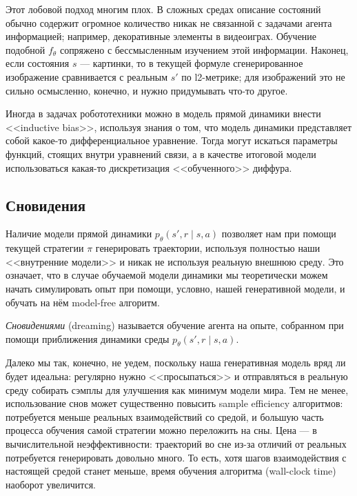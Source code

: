 Этот лобовой подход многим плох. В сложных средах описание состояний обычно содержит огромное количество никак не связанной с задачами агента информацией; например, декоративные элементы в видеоиграх. Обучение подобной $f_\theta$ сопряжено с бессмысленным изучением этой информации. Наконец, если состояния $s$ --- картинки, то в текущей формуле сгенерированное изображение сравнивается с реальным $s'$ по l2-метрике; для изображений это не сильно осмысленно, конечно, и нужно придумывать что-то другое.


\begin{remark}
Иногда в задачах робототехники можно в модель прямой динамики внести <<inductive bias>>, используя знания о том, что модель динамики представляет собой какое-то дифференциальное уравнение. Тогда могут искаться параметры функций, стоящих внутри уравнений связи, а в качестве итоговой модели использоваться какая-то дискретизация <<обученного>> диффура.
\end{remark}

\subsection{Сновидения}

Наличие модели прямой динамики $p_\theta(s', r \mid s, a)$ позволяет нам при помощи текущей стратегии $\pi$ генерировать траектории, используя полностью наши <<внутренние модели>> и никак не используя реальную внешнюю среду. Это означает, что в случае обучаемой модели динамики мы теоретически можем начать симулировать опыт при помощи, условно, нашей генеративной модели, и обучать на нём model-free алгоритм.

\begin{definition}
\emph{Сновидениями} (dreaming) называется обучение агента на опыте, собранном при помощи приближения динамики среды $p_\theta(s', r \mid s, a)$.
\end{definition}

Далеко мы так, конечно, не уедем, поскольку наша генеративная модель вряд ли будет идеальна: регулярно нужно <<просыпаться>> и отправляться в реальную среду собирать сэмплы для улучшения как минимум модели мира. Тем не менее, использование снов может существенно повысить sample efficiency алгоритмов: потребуется меньше реальных взаимодействий со средой, и большую часть процесса обучения самой стратегии можно переложить на сны. Цена --- в вычислительной неэффективности: траекторий во сне из-за отличий от реальных потребуется генерировать довольно много. То есть, хотя шагов взаимодействия с настоящей средой станет меньше, время обучения алгоритма (wall-clock time) наоборот увеличится. 

